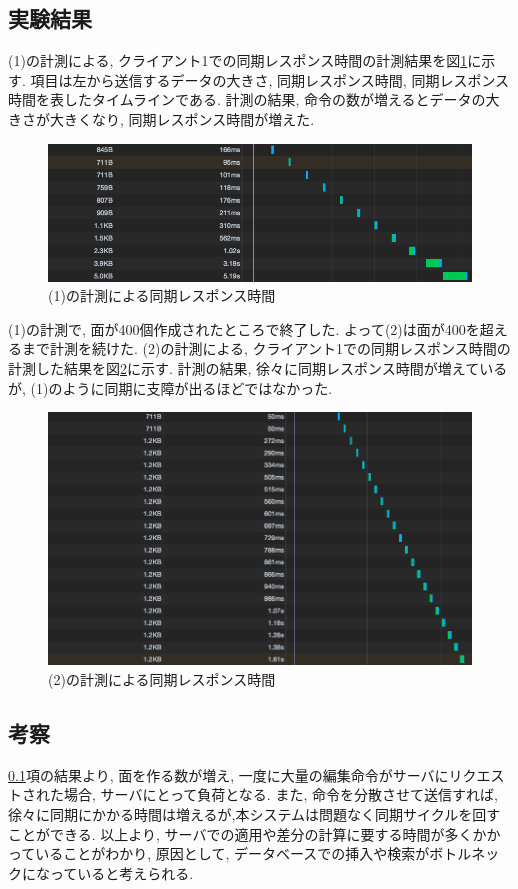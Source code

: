 \subsection{実験結果} \label{実験2の結果}
(1)の計測による, クライアント1での同期レスポンス時間の計測結果を図\ref{jikken3}に示す.
項目は左から送信するデータの大きさ, 同期レスポンス時間, 同期レスポンス時間を表したタイムラインである. 計測の結果, 命令の数が増えるとデータの大きさが大きくなり, 同期レスポンス時間が増えた.
\begin{figure}[]
 \begin{center}
	 \includegraphics[scale=0.5]{images/jikken3}
	 \caption{(1)の計測による同期レスポンス時間}
	 \label{jikken3}
 \end{center}
\end{figure}
(1)の計測で, 面が400個作成されたところで終了した. よって(2)は面が400を超えるまで計測を続けた.
(2)の計測による, クライアント1での同期レスポンス時間の計測した結果を図\ref{jikken2}に示す.
計測の結果, 徐々に同期レスポンス時間が増えているが, (1)のように同期に支障が出るほどではなかった.
\begin{figure}[]
 \begin{center}
	 \includegraphics[scale=0.5]{images/jikken2}
	 \caption{(2)の計測による同期レスポンス時間}
	 \label{jikken2}
 \end{center}
\end{figure}
\subsection{考察}
\ref{実験2の結果}項の結果より, 面を作る数が増え, 一度に大量の編集命令がサーバにリクエストされた場合, サーバにとって負荷となる.
また, 命令を分散させて送信すれば, 徐々に同期にかかる時間は増えるが,本システムは問題なく同期サイクルを回すことができる.
以上より, サーバでの適用や差分の計算に要する時間が多くかかっていることがわかり, 原因として, データベースでの挿入や検索がボトルネックになっていると考えられる.
